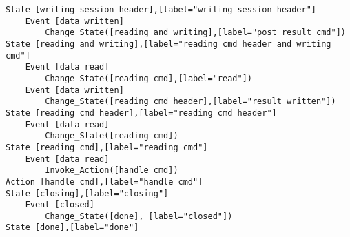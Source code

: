 \begin{verbatim}
State [writing session header],[label="writing session header"]
	Event [data written]
		Change_State([reading and writing],[label="post result cmd"])
State [reading and writing],[label="reading cmd header and writing cmd"]
	Event [data read]
		Change_State([reading cmd],[label="read"])
	Event [data written]
		Change_State([reading cmd header],[label="result written"])
State [reading cmd header],[label="reading cmd header"]
	Event [data read]
		Change_State([reading cmd])
State [reading cmd],[label="reading cmd"]
	Event [data read]
		Invoke_Action([handle cmd])
Action [handle cmd],[label="handle cmd"]
State [closing],[label="closing"]
	Event [closed]
		Change_State([done], [label="closed"])
State [done],[label="done"]
\end{verbatim}
